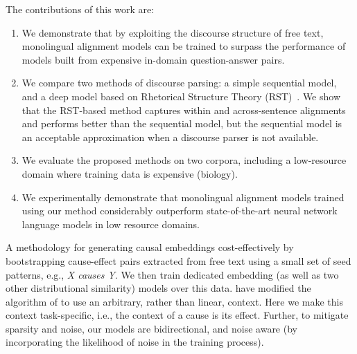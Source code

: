 The contributions of this work are:
\begin{enumerate}

\item We demonstrate that by exploiting the discourse structure of free text, monolingual alignment models can be trained to surpass the performance of models built from expensive in-domain question-answer pairs. 

\item We compare two methods of discourse parsing: a simple sequential model, and a deep model based on Rhetorical Structure Theory (RST)~\cite{mann88}.  We show that the RST-based method captures within and across-sentence alignments and performs better than the sequential model, but the sequential model is an acceptable approximation when a discourse parser is not available.  

\item We evaluate the proposed methods on two corpora, including a low-resource domain where training data is expensive (biology).

\item We experimentally demonstrate that monolingual alignment models trained using our method considerably outperform state-of-the-art neural network language models in low resource domains.
\end{enumerate}

{} 
A methodology for generating causal embeddings cost-effectively by bootstrapping cause-effect pairs extracted from free text using a small set of seed patterns, e.g., {\em X causes Y}. 
We then train dedicated embedding (as well as two other distributional similarity) models over this data. \citet{levy2014dependency} have modified the algorithm of\citet{mikolov2013distributed} to use an arbitrary, rather than linear, context. Here we make this context task-specific, i.e., the context of a cause is its effect.
Further, to mitigate sparsity and noise, our models are bidirectional, and noise aware (by incorporating the likelihood of noise in the training process). 

